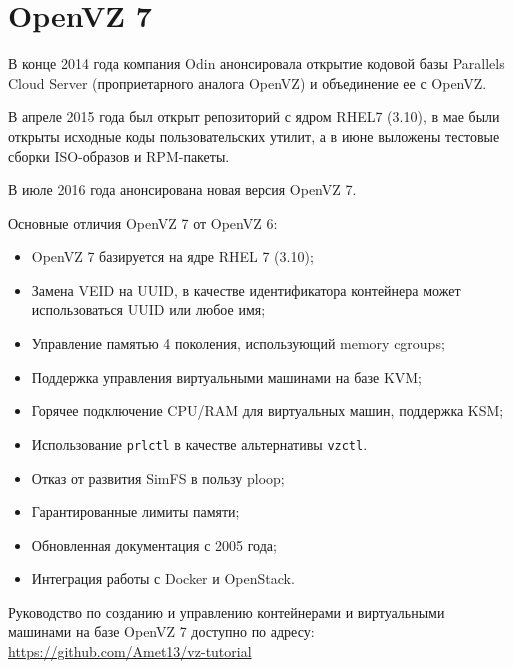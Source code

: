 \section{OpenVZ 7}

В конце 2014 года компания Odin анонсировала открытие кодовой базы Parallels Cloud Server (проприетарного аналога OpenVZ) и объединение ее с OpenVZ.

В апреле 2015 года был открыт репозиторий с ядром RHEL7 (3.10), в мае были открыты исходные коды пользовательских утилит, а в июне выложены тестовые сборки ISO-образов и RPM-пакеты.

В июле 2016 года анонсирована новая версия OpenVZ 7.

Основные отличия OpenVZ 7 от OpenVZ 6:
\begin{itemize}
    \item OpenVZ 7 базируется на ядре RHEL 7 (3.10);
    \item Замена VEID на UUID, в качестве идентификатора контейнера может использоваться UUID или любое имя;
    \item Управление памятью 4 поколения, использующий memory cgroups;
    \item Поддержка управления виртуальными машинами на базе KVM;
    \item Горячее подключение CPU/RAM для виртуальных машин, поддержка KSM;
    \item Использование \texttt{prlctl} в качестве альтернативы \texttt{vzctl}.
    \item Отказ от развития SimFS в пользу ploop;
    \item Гарантированные лимиты памяти;
    \item Обновленная документация с 2005 года;
    \item Интеграция работы с Docker и OpenStack.
\end{itemize}

Руководство по созданию и управлению контейнерами и виртуальными машинами на базе OpenVZ 7 доступно по адресу: \url{https://github.com/Amet13/vz-tutorial}

\clearpage
